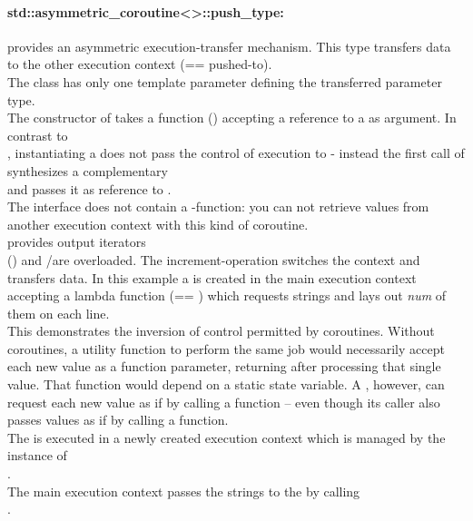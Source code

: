 \paragraph*{std::asymmetric\_coroutine<>::push\_type:}
provides an asymmetric execution-transfer mechanism. This type transfers data to
the other execution context (== pushed-to).\\
The class has only one template parameter defining the transferred parameter
type.\\
The constructor of \pushcoro takes a function (\corofunction) accepting a
reference to a \pullcoro as argument. In contrast to\\
\pullcoro, instantiating a \pushcoro does not pass the control of execution to
\corofunction{ }- instead the first call of\\
\pushcoroop synthesizes a complementary\\
\pullcoro and passes it as reference to \corofunction.\\
\newline
The \pushcoro interface does not contain a \get-function: you can not retrieve
values from another execution context with this kind of coroutine.\\
\newline
\pushcoro provides output iterators\\
(\pushcoroiterator) and \bgin/\ed are overloaded. The increment-operation
switches the context and transfers data.
In this example a \pushcoro is created in the main execution context accepting
a lambda function (== \corofunction) which requests strings and lays
out \textit{num} of them on each line.\\
This demonstrates the inversion of control permitted by coroutines. Without
coroutines, a utility function to perform the same job would necessarily
accept each new value as a function parameter, returning after processing that
single value. That function would depend on a static state variable. A
\corofunction, however, can request each new value as if by calling a function
-- even though its caller also passes values as if by calling a function.\\
The \corofunction is executed in a newly created execution context which is
managed by the instance of\\
\pushcoro.\\
The main execution context passes the strings to the
\corofunction by calling\\
\pushcoroop.\\
